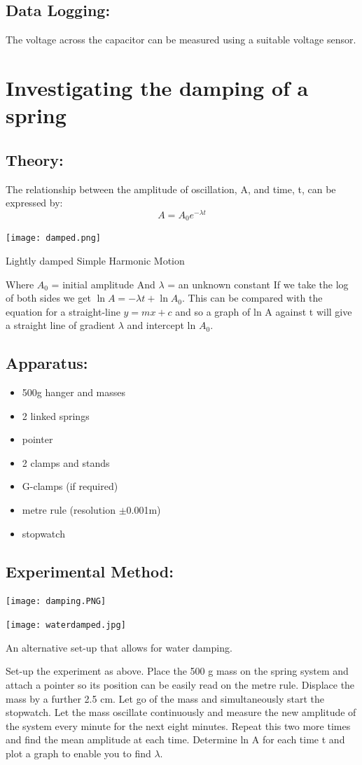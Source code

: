 \subsection{Data Logging:} The voltage across the capacitor can be measured using a suitable voltage sensor.



\section{Investigating the damping of a spring}
\subsection{Theory:}
The relationship between the amplitude of oscillation, A, and time, t, can be expressed by:
\[A=A_{0}e^{- \lambda t}\] \begin{marginfigure}
\texttt{[image: damped.png]}
\caption{Lightly damped Simple Harmonic Motion}
\end{marginfigure}
Where \(A_0\) = initial amplitude
And \(\lambda \) = an unknown constant
If we take the log of both sides we get \( \ln A = -\lambda t + \ln A_{0} \). This can be compared with the equation for a straight-line \(y = mx + c\) and so a graph of ln A against t will give a straight line of gradient \(\lambda \) and intercept ln \(A_0\).
\subsection{Apparatus:}\begin{itemize}
	
\item 500g hanger and masses
\item 2 linked springs
\item pointer
\item 2 clamps and stands
\item G-clamps (if required)
\item metre rule (resolution $\pm$0.001m)
\item stopwatch
\end{itemize}

\subsection{Experimental Method:}
\texttt{[image: damping.PNG]} \begin{marginfigure}
\texttt{[image: waterdamped.jpg]}
\caption{An alternative set-up that allows for water damping.}
\end{marginfigure}
Set-up the experiment as above. Place the 500 g mass on the spring system and attach a pointer so its position can be easily read on the metre rule. Displace the mass by a further 2.5 cm. Let go of the mass and simultaneously start the stopwatch. Let the mass oscillate continuously and measure the new amplitude of the system every minute for the next eight minutes. Repeat this two more times and find the mean amplitude at each time. Determine ln A for each time t and plot a graph to enable you to find \(\lambda \).
